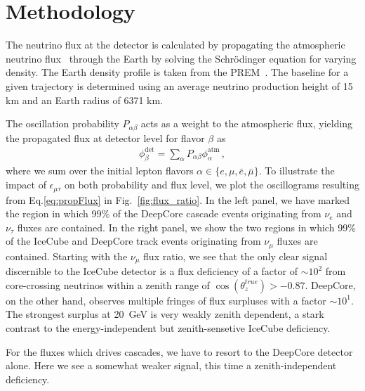 \documentclass[draft=True]{revtex4-2}
\newcommand{\ztrue}{\ensuremath{\cos{(\theta_z^{true})}}}
\newcommand{\emt}{\ensuremath{\epsilon_{\mu\tau}}}
\renewcommand{\ne}{\nu_e}
\newcommand{\nm}{\nu_\mu}
\newcommand{\nt}{\nu_\tau}
\begin{document}
\section{Methodology}
The neutrino flux at the detector is calculated by propagating the atmospheric neutrino flux~\cite{hondapaper} through the Earth by solving the 
Schrödinger equation for varying density. The Earth density profile is taken from the PREM~\cite{PREM}. The baseline for a given trajectory is determined using an average neutrino
production height of 15 km and an Earth radius of 6371 km. %


The oscillation probability $P_{\alpha \beta}$ acts as a weight to the atmospheric flux, yielding the propagated flux at detector level for flavor $\beta$ as 
\begin{align}\label{eq:propFlux}
    \phi_\beta^\text{det} = \sum_\alpha P_{\alpha\beta} \phi_\alpha^\text{atm} \,,
\end{align}
where we sum over the initial lepton flavors $\alpha \in \{e,\mu, \bar{e}, \bar{\mu}\}$. To illustrate the impact of $\emt$ on both probability
and flux level, we plot the oscillograms resulting from Eq.\ref{eq:propFlux} in Fig.~\ref{fig:flux_ratio}. In the left panel, we have marked the region in which 99\% of the 
DeepCore cascade events originating from $\ne$ and $\nt$ fluxes are contained. In the right panel, we show the two regions in which 99\% of the IceCube 
and DeepCore track events originating from $\nm$ fluxes are contained. Starting with the $\nm$ flux ratio, we see that the only clear signal discernible to the IceCube detector
is a flux deficiency of a factor of $\sim 10^2$ from core-crossing neutrinos within a zenith range of $\ztrue > -0.87$. DeepCore, on the other hand, 
observes multiple fringes of flux surpluses with a factor $\sim 10^1$. The strongest surplus at \SI{20}{\GeV} is very weakly zenith dependent, a stark contrast to the
energy-independent but zenith-sensetive IceCube deficiency.

For the fluxes which drives cascades, we have to resort to the DeepCore detector alone. %
Here we see a somewhat weaker signal, this time a zenith-independent deficiency. 
\end{document}
